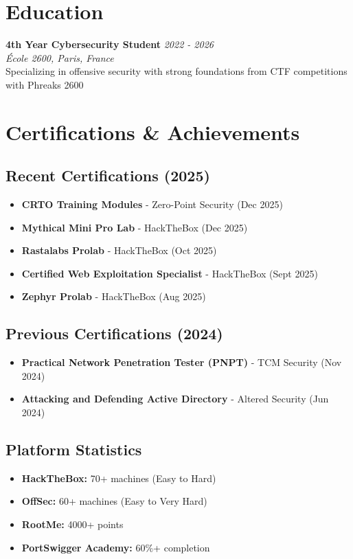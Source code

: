 \documentclass[10pt,a4paper]{article}
\begin{document}
\section{Education}

\textbf{4th Year Cybersecurity Student} \hfill \textit{2022 - 2026} \\
\textit{École 2600, Paris, France} \\
Specializing in offensive security with strong foundations from CTF competitions with Phreaks 2600

\section{Certifications \& Achievements}

\subsection*{Recent Certifications (2025)}
\begin{itemize}
\item \textbf{CRTO Training Modules} - Zero-Point Security (Dec 2025)
\item \textbf{Mythical Mini Pro Lab} - HackTheBox (Dec 2025)
\item \textbf{Rastalabs Prolab} - HackTheBox (Oct 2025)
\item \textbf{Certified Web Exploitation Specialist} - HackTheBox (Sept 2025)
\item \textbf{Zephyr Prolab} - HackTheBox (Aug 2025)
\end{itemize}

\subsection*{Previous Certifications (2024)}
\begin{itemize}
\item \textbf{Practical Network Penetration Tester (PNPT)} - TCM Security (Nov 2024)
\item \textbf{Attacking and Defending Active Directory} - Altered Security (Jun 2024)
\end{itemize}

\subsection*{Platform Statistics}
\begin{itemize}
\item \textbf{HackTheBox:} 70+ machines (Easy to Hard)
\item \textbf{OffSec:} 60+ machines (Easy to Very Hard)
\item \textbf{RootMe:} 4000+ points
\item \textbf{PortSwigger Academy:} 60\%+ completion
\end{itemize}
\end{document}
